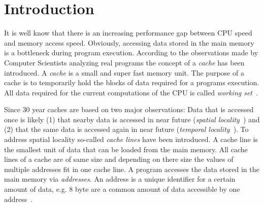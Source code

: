\documentclass[onecolumn, openright, master, english, signatures]{dbrgrptt}
\begin{document}

%
\thesisdate{\today}%
%
%

\frontmatter%

%


\mainmatter%

\chapter{Introduction}\label{cha:introduction}

It is well know that there is an increasing performance gap between CPU speed and memory access speed. Obviously, accessing data stored in the main memory is a bottleneck during program execution. According to the observations made by Computer Scientists analyzing real programs the concept of a \emph{cache} has been introduced. A \emph{cache} is a small and super fast memory unit. The purpose of a cache is to temporarily hold the blocks of data required for a programs execution. All data required for the current computations of the CPU is called \emph{working set}~\cite{denning1968working}.

Since 30 year caches are based on two major observations: Data that is accessed once is likely (1) that nearby data is accessed in near future (\emph{spatial locality}~\cite{jacob2010memory}) and (2) that the same data is accessed again in near future (\emph{temporal locality}~\cite{jacob2010memory}). To address spatial locality so-called \emph{cache lines} have been introduced. A cache line is the smallest unit of data that can be loaded from the main memory. All cache lines of a cache are of same size and depending on there size the values of multiple addresses fit in one cache line. A program accesses the data stored in the main memory via \emph{addresses}. An address is a unique identifier for a certain amount of data, e.g. 8 byte are a common amount of data accessible by one address~\cite{patterson2011computer}.
\end{document}
